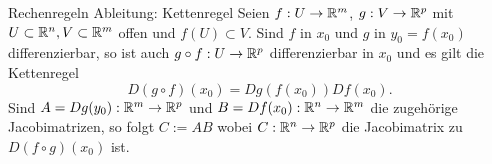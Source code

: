 \documentclass[main.tex]{subfiles}
\begin{document}
\begin{karte}{Rechenregeln Ableitung: Kettenregel}
    Seien \( f : U \rightarrow \mathbb{R}^m \), 
    \( g : V \rightarrow \mathbb{R}^p \)
    mit \( U \subset \mathbb{R}^n, V \subset \mathbb{R}^m \)
    offen und \( f(U) \subset V \).
    Sind \(f\) in \(x_0\) und \(g\) in \(y_0 = f(x_0)\)
    differenzierbar, so ist auch \(g \circ f : U \rightarrow \mathbb{R}^p\)
    differenzierbar in \(x_0\) und es gilt die 
    Kettenregel 
    \[ D(g\circ f)(x_0) = D g(f(x_0))Df(x_0). \]
    Sind \( A = Dg(y_0) : \mathbb{R}^m \rightarrow \mathbb{R}^p \) und 
    \( B = Df(x_0) : \mathbb{R}^n \rightarrow \mathbb{R}^m \)
    die zugehörige Jacobimatrizen, so folgt 
    \( C := AB \)
    wobei
    \( C : \mathbb{R}^n \rightarrow \mathbb{R}^p \) 
    die Jacobimatrix zu \( D(f \circ g)(x_0) \) ist.
\end{karte}
\end{document}
